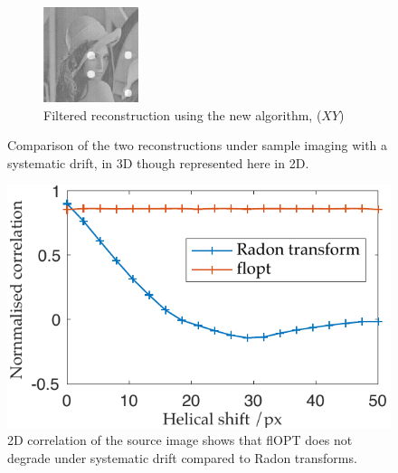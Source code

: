 \begin{figure}
\begin{subfigure}[t]{0.3\textwidth}
    \includegraphics[width=\textwidth]{Chapters/flopt/Figs/PDF/results/helix/filtered_recon_helix}
    \caption{Filtered reconstruction using the new algorithm, (\(XY\))}
    \label{fig:filtered_recon_helix}
  \end{subfigure}
    \hfill
    \label{fig:flopts}
  \caption{Comparison of the two reconstructions under sample imaging with a systematic drift, in 3D though represented here in 2D.}
\end{figure}
\begin{figure}
  \centering
  \includegraphics{Chapters/flopt/Figs/PDF/results/correlation_helicity}
  \caption{2D correlation of the source image shows that flOPT does not degrade under systematic drift compared to \gls{Radon transform}s.}
  \label{fig:helical_comparison}
\end{figure}

